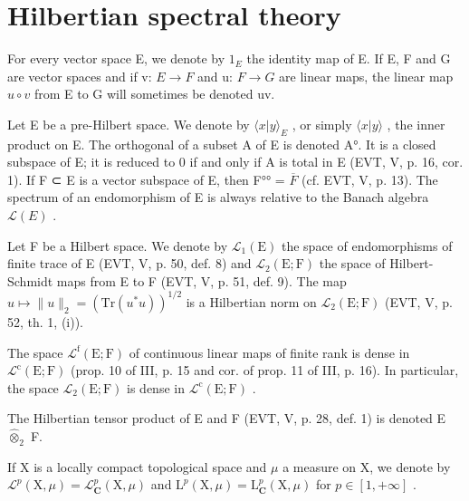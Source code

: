 \chapter{Hilbertian spectral theory}
\setcounter{exercisepar}{0}

For every vector space E, we denote by \(1_{E}\) the identity map of E. If E, F and G are vector spaces and if v: \(E \rightarrow F\) and u: \(F \rightarrow G\) are linear maps, the linear map \(u \circ v\) from E to G will sometimes be denoted uv.

Let E be a pre-Hilbert space. We denote by \(\langle x|y\rangle_{E}\) , or simply \(\langle x|y\rangle\) , the inner product on E. The orthogonal of a subset A of E is denoted A°. It is a closed subspace of E; it is reduced to 0 if and only if A is total in E (EVT, V, p. 16, cor. 1). If F ⊂ E is a vector subspace of E, then F°° = \(\overline{F}\) (cf. EVT, V, p. 13). The spectrum of an endomorphism of E is always relative to the Banach algebra \(\mathcal{L}(E)\) .

Let F be a Hilbert space. We denote by \(\mathcal{L}_1(\mathrm{E})\) the space of endomorphisms of finite trace of E (EVT, V, p. 50, def. 8) and \(\mathcal{L}_2(\mathrm{E};\mathrm{F})\) the space of Hilbert-Schmidt maps from E to F (EVT, V, p. 51, def. 9). The map \(u\mapsto \| u\| _2 = (\mathrm{Tr}(u^{*}u))^{1 / 2}\) is a Hilbertian norm on \(\mathcal{L}_2(\mathrm{E};\mathrm{F})\) (EVT, V, p. 52, th. 1, (i)).

The space \(\mathcal{L}^{\mathrm{f}}(\mathrm{E};\mathrm{F})\) of continuous linear maps of finite rank is dense in \(\mathcal{L}^{\mathrm{c}}(\mathrm{E};\mathrm{F})\) (prop. 10 of III, p. 15 and cor. of prop. 11 of III, p. 16). In particular, the space \(\mathcal{L}_2(\mathrm{E};\mathrm{F})\) is dense in \(\mathcal{L}^{\mathrm{c}}(\mathrm{E};\mathrm{F})\) .

The Hilbertian tensor product of E and F (EVT, V, p. 28, def. 1) is denoted E \(\widehat{\otimes}_2\) F.

If X is a locally compact topological space and \(\mu\) a measure on X, we denote by \(\mathcal{L}^{p}(\mathrm{X},\mu)=\mathcal{L}_{\mathbf{C}}^{p}(\mathrm{X},\mu)\) and \(\mathrm{L}^{p}(\mathrm{X},\mu)=\mathrm{L}_{\mathbf{C}}^{p}(\mathrm{X},\mu)\) for \(p\in[1,+\infty]\) .

